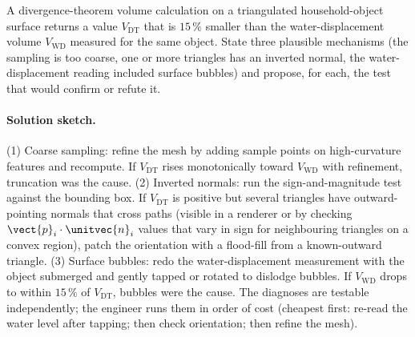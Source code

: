 \begin{exercise}
A divergence-theorem volume calculation on a triangulated
household-object surface returns a value $V_{\text{DT}}$ that is
$15\,\%$ smaller than the water-displacement volume $V_{\text{WD}}$
measured for the same object. State three plausible mechanisms (the
sampling is too coarse, one or more triangles has an inverted
normal, the water-displacement reading included surface bubbles)
and propose, for each, the test that would confirm or refute it.

\paragraph{Solution sketch.} (1) Coarse sampling: refine the mesh by
adding sample points on high-curvature features and recompute. If
$V_{\text{DT}}$ rises monotonically toward $V_{\text{WD}}$ with
refinement, truncation was the cause. (2) Inverted normals: run the
sign-and-magnitude test against the bounding box. If $V_{\text{DT}}$
is positive but several triangles have outward-pointing normals
that cross paths (visible in a renderer or by checking
$\vect{p}_{i}\cdot\unitvec{n}_{i}$ values that vary in sign for
neighbouring triangles on a convex region), patch the orientation
with a flood-fill from a known-outward triangle. (3) Surface
bubbles: redo the water-displacement measurement with the object
submerged and gently tapped or rotated to dislodge bubbles. If
$V_{\text{WD}}$ drops to within $15\,\%$ of $V_{\text{DT}}$, bubbles
were the cause. The diagnoses are testable independently; the
engineer runs them in order of cost (cheapest first: re-read the
water level after tapping; then check orientation; then refine the
mesh).
\end{exercise}

